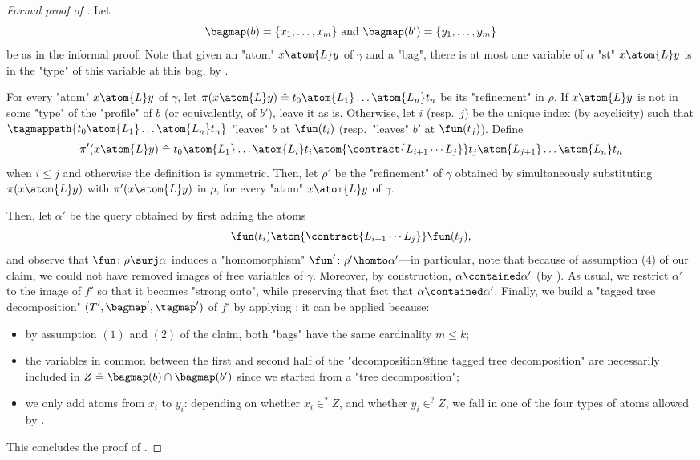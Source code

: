 \begin{proof}[Formal proof of ]
    Let
    \[\bagmap(b) = \{x_1,\hdots, x_m\}
    \text{ and }
    \bagmap(b') =\{y_1,\hdots,y_m\}
    \]
    be as in the informal proof.
    Note that given an "atom" $x \atom{L} y$ of $\gamma$ and
	a "bag", there is at most
    one variable of $\alpha$ "st" $x \atom{L} y$ is in the "type" of this variable
	at this bag, by .

    For every "atom" $x \atom{L} y$ of $\gamma$, let 
    $\pi(x \atom{L} y) \defeq t_0 \atom{L_1} \hdots \atom{L_n} t_n$
    be its "refinement" in $\rho$.
    If $x \atom{L} y$ is not in some "type" of the "profile" of $b$
    (or equivalently, of $b'$), leave it as is.
    Otherwise, let $i$ (resp.\ $j$) be the unique
    index (by acyclicity) such that
    $\tagmappath{t_0 \atom{L_1} \hdots \atom{L_n} t_n}$ "leaves" $b$
    at $\fun(t_i)$ (resp.\ "leaves" $b'$ at $\fun(t_j)$).
    Define
    \[
		\pi'(x \atom{L} y) \defeq
        t_0 \atom{L_1} \hdots \atom{L_i} t_i \atom{\contract{L_{i+1}\cdots L_j}}
        t_j \atom{L_{j+1}} \hdots \atom{L_n} t_n
    \]
    when $i \leq j$ and otherwise the definition is symmetric.
    Then, let $\rho'$ be the "refinement" of $\gamma$ obtained by simultaneously
    substituting $\pi(x \atom{L} y)$ with $\pi'(x\atom{L} y)$  in $\rho$,
    for every "atom" $x\atom{L} y$ of $\gamma$.

    Then, let $\alpha'$ be the query obtained by first
    adding the atoms  
    \[\fun(t_i) \atom{\contract{L_{i+1}\cdots L_j}} \fun(t_j),\]
    and observe that $\fun\colon \rho \surj \alpha$
    induces a "homomorphism" $\fun'\colon \rho' \homto \alpha'$---in particular, note that
	because of assumption (4) of our claim, we could not have removed images of
	free variables of $\gamma$.
    Moreover, by construction, $\alpha \contained \alpha'$ (by ).
	As usual, we restrict $\alpha'$ to the image of $f'$ so that it
	becomes "strong onto", while preserving that fact that $\alpha \contained \alpha'$.
	Finally, we build a "tagged tree decomposition" $(T', \bagmap', \tagmap')$
    of $f'$ by applying ; it can be applied because:
	\begin{itemize}
		\item by assumption $(1)$ and $(2)$ of the claim, both "bags" have the same cardinality $m \leq k$;
		\item the variables in common between the first and second half of the "decomposition@fine tagged tree decomposition" are necessarily included in $Z \defeq \bagmap(b) \cap \bagmap(b')$
		since we started from a "tree decomposition";
		\item we only add atoms from $x_i$ to $y_i$: depending on whether $x_i \in^? Z$,
		and whether $y_i \in^? Z$, we fall in one of the four types of atoms allowed
		by .
	\end{itemize}
	This concludes the proof of .
\end{proof}

